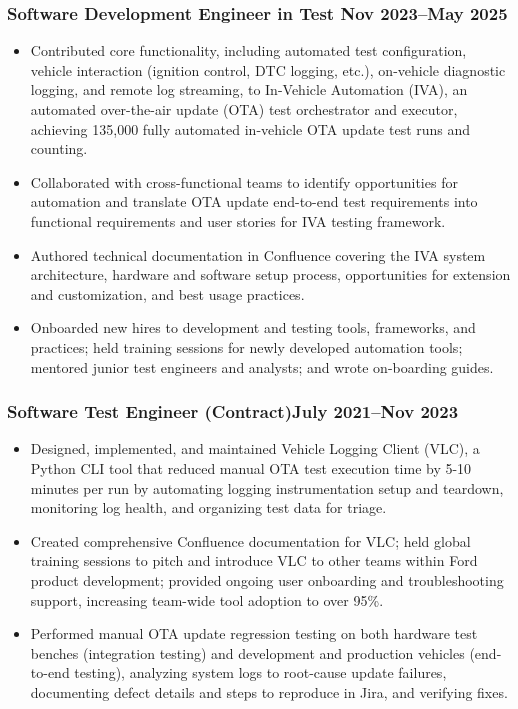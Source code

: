 \documentclass[11pt]{article}
\begin{document}
\subsubsection{Software Development Engineer in Test \hfill Nov 2023--May 2025}
\begin{itemize}
  \item Contributed core functionality, including automated test configuration,
  vehicle interaction (ignition control, DTC logging, etc.), on-vehicle 
  diagnostic logging, and remote log streaming, to In-Vehicle Automation (IVA), 
  an automated over-the-air update (OTA) test orchestrator and executor, achieving 135,000 fully 
  automated in-vehicle OTA update test runs and counting.
  \item Collaborated with cross-functional teams to identify opportunities for 
  automation and translate OTA update end-to-end test requirements into functional requirements and user stories for IVA testing framework.
  \item Authored technical documentation in Confluence covering the IVA system 
  architecture, hardware and software setup process, opportunities for extension and customization, and best usage practices.
  \item Onboarded new hires to development and testing tools, frameworks, and practices; held training sessions for newly developed automation 
  tools; mentored junior test engineers and analysts; and wrote on-boarding guides.
\end{itemize}

\subsubsection{Software Test Engineer (Contract)\hfill July 2021--Nov 2023}
\begin{itemize}
  \item Designed, implemented, and maintained Vehicle Logging Client (VLC),
  a Python CLI tool that reduced manual OTA test execution time by 5-10 minutes 
  per run by automating logging instrumentation setup and teardown, monitoring 
  log health, and organizing test data for triage.
  \item Created comprehensive Confluence documentation for VLC; held global training 
  sessions to pitch and introduce VLC to other teams within Ford product development;
  provided ongoing user onboarding and troubleshooting support, increasing team-wide 
  tool adoption to over 95\%.
  \item Performed manual OTA update regression testing on both hardware test 
  benches (integration testing) and development and production vehicles 
  (end-to-end testing), analyzing system logs to root-cause update failures, 
  documenting defect details and steps to reproduce in Jira, and verifying fixes.
\end{itemize}
\end{document}
